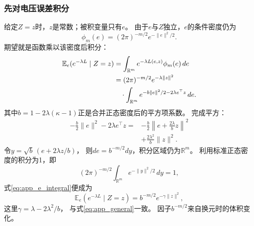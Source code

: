 \documentclass[journal,10pt]{IEEEtran}
\newcommand{\E}{\mathbb E}
\newcommand{\R}{\mathbb R}
\begin{document}
\subsubsection{先对电压误差积分}
给定$Z=z$时，$z$是常数；被积变量只有$e$。
由于$e$与$Z$独立，$e$的条件密度仍为
\[
\phi_m(e)=(2\pi)^{-m/2}e^{-\|e\|^2/2}.
\]
期望就是函数乘以该密度后积分：
\begin{align}
\E_e(e^{-\lambda L}\mid Z=z)
&=\int_{\R^m}
 e^{-\lambda L(e,z)}\phi_m(e)\,de\notag\\
&=(2\pi)^{-m/2}e^{-\lambda\|z\|^2}\notag\\
&\quad\cdot\int_{\R^m}
 e^{-b\|e\|^2/2-2\lambda e^\top z}\,de. \label{eq:app_e_integral}
\end{align}
其中$b=1-2\lambda(\kappa-1)$正是合并正态密度后的平方项系数。
完成平方：
\begin{equation}
\begin{split}
-\frac b2\|e\|^2-2\lambda e^\top z
={}&-\frac b2\left\|e+\frac{2\lambda}{b}z\right\|^2\\
&+\frac{2\lambda^2}{b}\|z\|^2.
\end{split} \label{eq:app_e_square}
\end{equation}
令$y=\sqrt b\,(e+2\lambda z/b)$，
则$de=b^{-m/2}dy$，积分区域仍为$\R^m$。
利用标准正态密度的积分为1，即
\[
(2\pi)^{-m/2}\int_{\R^m}e^{-\|y\|^2/2}\,dy=1,
\]
式\eqref{eq:app_e_integral}便成为
\begin{equation}
\E_e(e^{-\lambda L}\mid Z=z)
=b^{-m/2}e^{-\gamma\|z\|^2}, \label{eq:app_e_result}
\end{equation}
这里$\gamma=\lambda-2\lambda^2/b$，
与式\eqref{eq:app_general}一致。
因子$b^{-m/2}$来自换元时的体积变化。
\end{document}
